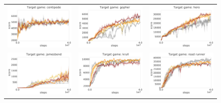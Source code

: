 \begin{figure}
\begin{tabular}{ccc}
        \includegraphics[width=.33\textwidth]{figures/app_plots/mainpaper-nolegend-seaquest_riverraid_pong_to_centipede} &
        \includegraphics[width=.33\textwidth]{figures/app_plots/mainpaper-nolegend-seaquest_riverraid_pong_to_gopher} &
        \includegraphics[width=.33\textwidth]{figures/app_plots/mainpaper-nolegend-seaquest_riverraid_pong_to_hero} \\

        \includegraphics[width=.33\textwidth]{figures/app_plots/mainpaper-nolegend-seaquest_riverraid_pong_to_jamesbond} &
        \includegraphics[width=.33\textwidth]{figures/app_plots/mainpaper-nolegend-seaquest_riverraid_pong_to_krull} &
        \includegraphics[width=.33\textwidth]{figures/app_plots/mainpaper-nolegend-seaquest_riverraid_pong_to_road_runner} \\


\end{tabular}
\end{figure}
